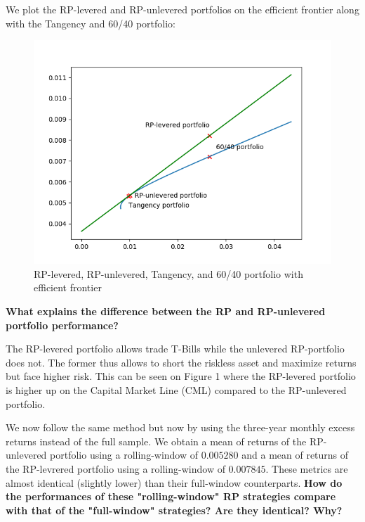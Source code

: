 \documentclass[10pt]{article}
\newenvironment{exercise}[2][Exercise]{\begin{trivlist}
  \item[\hskip \labelsep {\bfseries #1}\hskip \labelsep {\bfseries #2.}]}{\end{trivlist}}
\begin{document}
\begin{exercise}{3}
	We plot the RP-levered and RP-unlevered portfolios on the efficient frontier along with the Tangency and 60/40 portfolio:
	
	\begin{figure}[H]
	
		\centering
		\includegraphics[scale=0.8]{figures/ex3.png}	
		\caption{RP-levered, RP-unlevered, Tangency, and 60/40 portfolio with efficient frontier}	
		\label{fig:ex3}
	
	\end{figure} 
	
	\textbf{What explains the difference between the RP and RP-unlevered portfolio performance?}
	
	\smallbreak
	
	The RP-levered portfolio allows trade T-Bills while the unlevered RP-portfolio does not. The former thus allows to short the riskless asset and maximize returns but face higher risk. This can be seen on Figure 1 where the RP-levered portfolio is higher up on the Capital Market Line (CML) compared to the RP-unlevered portfolio.
	
	\bigbreak	
	
	We now follow the same method but now by using the three-year monthly excess returns instead of the full sample. We obtain a mean of returns of the RP-unlevered portfolio using a rolling-window of $0.005280$ and a mean of returns of the RP-levrered portfolio using a rolling-window of $0.007845$. These metrics are almost identical (slightly lower) than their full-window counterparts. \textbf{How do the performances of these "rolling-window" RP strategies compare with that of the "full-window" strategies? Are they identical? Why?} 
	

\end{exercise}
\end{document}
